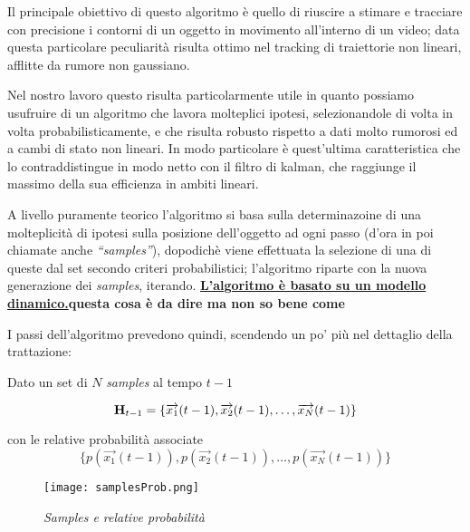 Il principale obiettivo di questo algoritmo è quello di riuscire a stimare e tracciare con precisione i contorni di un oggetto in movimento all'interno di un video; data questa particolare peculiarità risulta ottimo nel tracking di traiettorie non lineari, afflitte da rumore non gaussiano.

Nel nostro lavoro questo risulta particolarmente utile in quanto possiamo usufruire di un algoritmo che lavora molteplici ipotesi, selezionandole di volta in volta probabilisticamente, e che risulta robusto rispetto a dati molto rumorosi ed a cambi di stato non lineari. In modo particolare è quest'ultima caratteristica che lo contraddistingue in modo netto con il filtro di kalman, che raggiunge il massimo della sua efficienza in ambiti lineari.

A livello puramente teorico l'algoritmo si basa sulla determinazoine di una molteplicità di ipotesi sulla posizione dell'oggetto ad ogni passo (d'ora in poi chiamate anche \textit{``samples''}), dopodichè viene effettuata la selezione di una di queste dal set secondo criteri probabilistici; l'algoritmo riparte con la nuova generazione dei \textit{samples}, iterando. \textbf{\underline{L'algoritmo è basato su un modello dinamico.}questa cosa è da dire ma non so bene come}


I passi dell'algoritmo prevedono quindi, scendendo un po' più nel dettaglio della trattazione: 

Dato un set di $N$ \textit{samples} al tempo $t-1$

\begin{equation}\label{eq:H}
\mbox{{\bfseries H}}_{t-1}= \lbrace \overrightarrow{x_1}(t-1),\overrightarrow{x_2}(t-1), \ldots,  \overrightarrow{x_N}(t-1) \rbrace
\end{equation} 

con le relative probabilità associate
\begin{equation}\label{eq:pH}
\lbrace p(\overrightarrow{x_1}(t-1)),p(\overrightarrow{x_2}(t-1)), \ldots, p( \overrightarrow{x_N}(t-1)) \rbrace
\end{equation} 

\begin{figure}[hb]
\centering
	\texttt{[image: samplesProb.png]}
\caption{\textit{Samples e relative probabilità}\label{fig:samplesProb}}
\end{figure}

